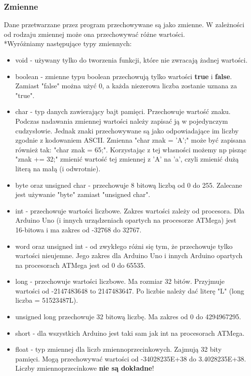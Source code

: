 \documentclass[a4paper,12pt, twoside]{article}
\begin{document}
	\subsubsection{Zmienne}
		Dane przetwarzane przez program przechowywane są jako zmienne. W zależności od rodzaju zmiennej może ona przechowywać różne wartości.
		\\*Wyróżniamy następujące typy zmiennych:
		\begin{itemize}
			\item void - używany tylko do tworzenia funkcji, które nie zwracają żadnej wartości.
			\item boolean - zmienne typu boolean przechowują tylko wartości \textbf{true} i \textbf{false}. Zamiast "false" można użyć 0, a każda niezerowa liczba zostanie uznana za "true".
			\item char - typ danych zawierający bajt pamięci. Przechowuje wartość znaku.
				Podczas nadawania zmiennej wartości należy zapisać ją w pojedynczym cudzysłowie.
				Jednak znaki przechowywane są jako odpowiadające im liczby zgodnie z kodowaniem ASCII.
				Zmienna "char znak = 'A';" może być zapisana również tak: "char znak = 65;".
				Korzystając z tej własności możemy np pisząc "znak += 32;" zmienić wartość tej zmiennej z 'A' na 'a', czyli zmienić dużą literą na małą (i odwrotnie).
			\item byte oraz unsigned char - przechowuje 8 bitową liczbą od 0 do 255. Zalecane jest używanie "byte" zamiast "unsigned char".
			\item int - przechowuje wartości liczbowe. Zakres wartości zależy od procesora.
				Dla Arduino Uno (i innych urządzeniach opartych na procesorze ATMega) jest 16-bitowa i ma zakres od -32768 do 32767.
			\item word oraz unsigned int - od zwykłego różni się tym, że przechowuje tylko wartości nieujemne.
				Jego zakres dla Arduino Uno i innych Arduino opartych na procesorach ATMega jest od 0 do 65535.
			\item long - przechowuje wartości liczbowe. Ma rozmiar 32 bitów. Przyjmuje wartości od -2147483648 to 2147483647. Po liczbie należy dać literę "L" (long liczba = 51523487L).
			\item unsigned long przechowuje 32 bitową liczbę. Ma zakres od 0 do 4294967295.
			\item short - dla wszystkich Arduino jest taki sam jak int na procesorach ATMega.
			\item float - typ zmiennej dla liczb zmiennoprzecinkowych. Zajmują 32 bity pamięci. Mogą przechowywać wartości od -34028235E+38 do 3.4028235E+38. Liczby zmiennoprzecinkowe \textbf{nie są dokładne}!

\end{itemize}
\end{document}
